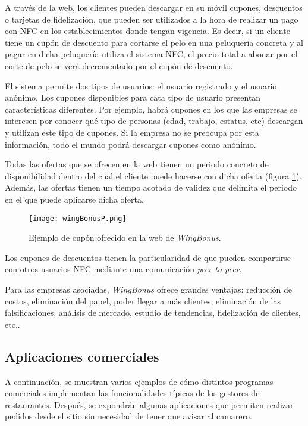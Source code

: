   A través de la web, los clientes pueden descargar en su móvil cupones, 
  descuentos o tarjetas de fidelización, que pueden ser utilizados a la hora 
  de realizar un pago con \acs{NFC} en los establecimientos donde tengan 
  vigencia. Es decir, si un cliente tiene un cupón de descuento para cortarse 
  el pelo en una peluquería concreta y al pagar en dicha peluquería utiliza el 
  sistema \acs{NFC}, el precio total a abonar por el corte de pelo se verá 
  decrementado por el cupón de descuento.

  El sistema permite dos tipos de usuarios: el usuario registrado y el usuario
  anónimo. Los cupones disponibles para cata tipo de usuario presentan
  características diferentes. Por ejemplo, habrá cupones en los que las
  empresas se interesen por conocer qué tipo de personas (edad, trabajo,
  estatus, etc) descargan y utilizan este tipo de cupones. Si la empresa no
  se preocupa por esta información, todo el mundo podrá descargar cupones
  como anónimo.

  Todas las ofertas que se ofrecen en la web tienen un periodo concreto de
  disponibilidad dentro del cual el cliente puede hacerse con dicha oferta
  (figura \ref{fig:wingBonusP}). Además, las ofertas tienen un tiempo acotado
  de validez que delimita el periodo en el que puede aplicarse dicha oferta.

  \begin{figure}[!h]
    \begin{center}
      \texttt{[image: wingBonusP.png]}
      \caption{Ejemplo de cupón ofrecido en la web de \emph{WingBonus}.}
      \label{fig:wingBonusP}
    \end{center}
  \end{figure}

  Los cupones de descuentos tienen la particularidad de que pueden compartirse
  con otros usuarios \acs{NFC} mediante una comunicación \emph{peer-to-peer}.

  Para las empresas asociadas, \emph{WingBonus} ofrece grandes ventajas: 
  reducción de costos, eliminación del papel, poder llegar a más clientes,
  eliminación de las falsificaciones, análisis de mercado, estudio de
  tendencias, fidelización de clientes, etc.\cite{bib:wingBonus}.

  \subsection{Aplicaciones comerciales}
  A continuación, se muestran varios ejemplos de cómo distintos programas
  comerciales implementan las funcionalidades típicas de los gestores de
  restaurantes. Después, se expondrán algunas aplicaciones que permiten
  realizar pedidos desde el sitio sin necesidad de tener que avisar al
  camarero.

